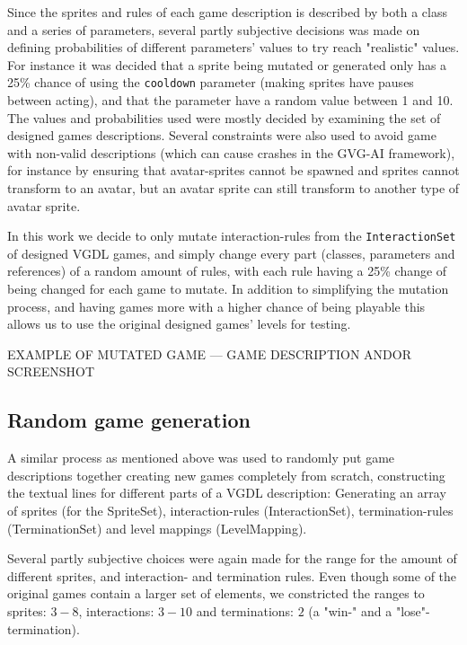 \documentclass[a4paper,titlepage,final]{report}
\begin{document}
Since the sprites and rules of each game description is described by both a class and a series of parameters, several partly subjective decisions was made on defining probabilities of different parameters' values to try reach "realistic" values.
For instance it was decided that a sprite being mutated or generated only has a 25\% chance of using the \texttt{cooldown} parameter (making sprites have pauses between acting), and that the parameter have a random value between 1 and 10.
The values and probabilities used were mostly decided by examining the set of designed games descriptions.
Several constraints were also used to avoid game with non-valid descriptions (which can cause crashes in the GVG-AI framework), for instance by ensuring that avatar-sprites cannot be spawned and sprites cannot transform to an avatar, but an avatar sprite can still transform to another type of avatar sprite.

In this work we decide to only mutate interaction-rules from the \texttt{InteractionSet} of designed VGDL games, and simply change every part (classes, parameters and references) of a random amount of rules, with each rule having a 25\% change of being changed for each game to mutate.
In addition to simplifying the mutation process, and having games more with a higher chance of being playable this allows us to use the original designed games' levels for testing.



EXAMPLE OF MUTATED GAME --- GAME DESCRIPTION ANDOR SCREENSHOT


\subsection{Random game generation}
\label{ssec_task1rndGen}
A similar process as mentioned above was used to randomly put game descriptions together creating new games completely from scratch, constructing the textual lines for different parts of a VGDL description: Generating an array of sprites (for the SpriteSet), interaction-rules (InteractionSet), termination-rules (TerminationSet) and level mappings (LevelMapping). 

Several partly subjective choices were again made for the range for the amount of different sprites, and interaction- and termination rules. 
Even though some of the original games contain a larger set of elements, we constricted the ranges to sprites: ${3-8}$, interactions: ${3-10}$ and terminations: ${2}$ (a "win-" and a "lose"-termination).
\end{document}
